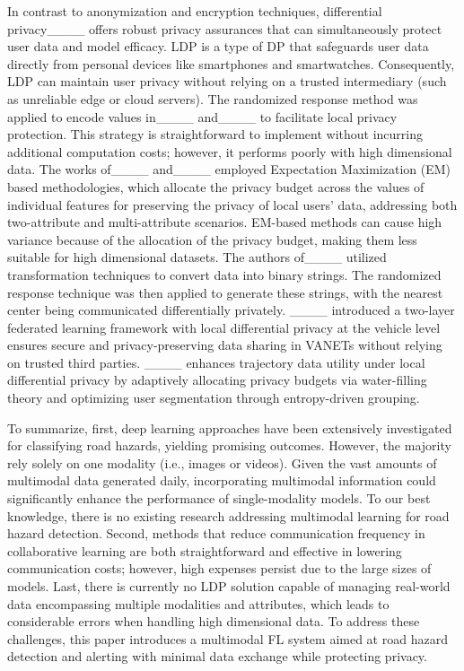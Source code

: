 In contrast to anonymization and encryption techniques, differential privacy____ offers robust privacy assurances that can simultaneously protect user data and model efficacy. LDP is a type of DP that safeguards user data directly from personal devices like smartphones and smartwatches. Consequently, LDP can maintain user privacy without relying on a trusted intermediary (such as unreliable edge or cloud servers). The randomized response method was applied to encode values in____ and____ to facilitate local privacy protection. This strategy is straightforward to implement without incurring additional computation costs; however, it performs poorly with high dimensional data. The works of____ and____ employed Expectation Maximization (EM) based methodologies, which allocate the privacy budget across the values of individual features for preserving the privacy of local users’ data, addressing both two-attribute and multi-attribute scenarios. EM-based methods can cause high variance because of the allocation of the privacy budget, making them less suitable for high dimensional datasets. The authors of____ utilized transformation techniques to convert data into binary strings. The randomized response technique was then applied to generate these strings, with the nearest center being communicated differentially privately. 
____ introduced a two-layer federated learning framework with local differential privacy at the vehicle level ensures secure and privacy-preserving data sharing in VANETs without relying on trusted third parties.
____ enhances trajectory data utility under local differential privacy by adaptively allocating privacy budgets via water-filling theory and optimizing user segmentation through entropy-driven grouping.

To summarize, first, deep learning approaches have been extensively investigated for classifying road hazards, yielding promising outcomes. However, the majority rely solely on one modality (i.e., images or videos). Given the vast amounts of multimodal data generated daily, incorporating multimodal information could significantly enhance the performance of single-modality models. To our best knowledge, there is no existing research addressing multimodal learning for road hazard detection. Second, methods that reduce communication frequency in collaborative learning are both straightforward and effective in lowering communication costs; however, high expenses persist due to the large sizes of models. Last, there is currently no LDP solution capable of managing real-world data encompassing multiple modalities and attributes, which leads to considerable errors when handling high dimensional data. To address these challenges, this paper introduces a multimodal FL system aimed at road hazard detection and alerting with minimal data exchange while protecting privacy.